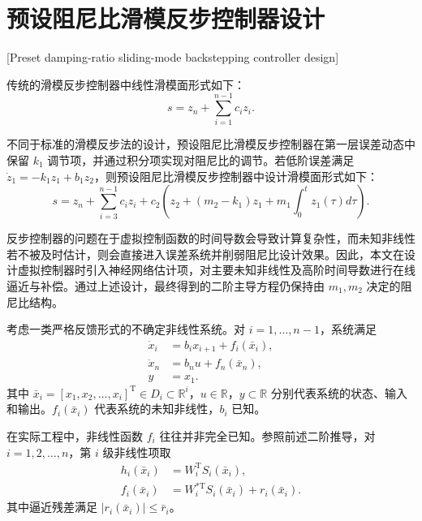 \section{预设阻尼比滑模反步控制器设计}[Preset damping-ratio sliding-mode backstepping controller design]\label{sec:ch3_prob}

传统的滑模反步控制器中线性滑模面形式如下：
\begin{equation}\label{eq:ch3_sm_linear_mid}
  s=z_n+\sum_{i=1}^{n-1}c_i z_i.
\end{equation}

不同于标准的滑模反步法的设计，预设阻尼比滑模反步控制器在第一层误差动态中保留 $k_1$ 调节项，并通过积分项实现对阻尼比的调节。若低阶误差满足 $\dot z_1=-k_1z_1+b_1z_2$，则预设阻尼比滑模反步控制器中设计滑模面形式如下：
\begin{equation}\label{eq:ch3_sm_mid}
  s=z_n+\sum_{i=3}^{n-1}c_i z_i+c_2\left(z_2+(m_2-k_1)z_1+m_1\int_0^t z_1(\tau)d\tau\right).
\end{equation}

反步控制器的问题在于虚拟控制函数的时间导数会导致计算复杂性，而未知非线性若不被及时估计，则会直接进入误差系统并削弱阻尼比设计效果。因此，本文在设计虚拟控制器时引入神经网络估计项，对主要未知非线性及高阶时间导数进行在线逼近与补偿。通过上述设计，最终得到的二阶主导方程仍保持由 $m_1,m_2$ 决定的阻尼比结构。

考虑一类严格反馈形式的不确定非线性系统。对 $i=1,\ldots,n-1$，系统满足
{\setlength{\abovedisplayskip}{-9pt}
\setlength{\abovedisplayshortskip}{-9pt}
\begin{subequations}\label{eq:ch3_sys_mid}
\begin{align}
\dot x_i&=b_i x_{i+1}+f_i(\bar x_i),\label{eq:ch3_sys_mid_a}\\
\dot x_n&=b_nu+f_n(\bar x_n),\label{eq:ch3_sys_mid_b}\\
y&=x_1.\label{eq:ch3_sys_mid_c}
\end{align}
\end{subequations}
}
其中 $\bar x_i=[x_1,x_2,\ldots,x_i]^\mathrm{T}\in D_i\subset\mathbb{R}^i$，$u\in\mathbb{R}$，$y\subset\mathbb{R}$ 分别代表系统的状态、输入和输出。$f_i(\bar x_i)$ 代表系统的未知非线性，$b_i$ 已知。

在实际工程中，非线性函数 $f_i$ 往往并非完全已知。参照前述二阶推导，对 $i=1,2,\ldots,n$，第 $i$ 级非线性项取
\begin{subequations}
\begin{align}
  h_i(\bar x_i) &= W_i^{\mathrm T}S_i(\bar x_i), \label{eq:ch2_hi_nn}\\
  f_i(\bar x_i) &= W_i^{\ast\mathrm T}S_i(\bar x_i)+r_i(\bar x_i). \label{eq:ch2_hi_delta}
\end{align}
\end{subequations}
其中逼近残差满足 $|r_i(\bar x_i)|\le \bar r_i$。

